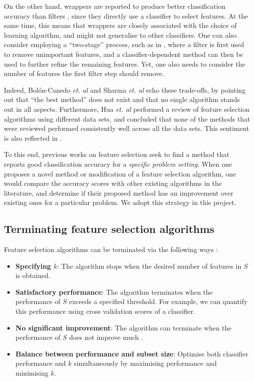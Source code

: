 \documentclass[12pt, twoside, a4paper]{report}
\begin{document}
On the other hand, wrappers are reported to produce better classification accuracy than filters \cite{RefWorks:163}, since they directly use a classifier to select features. At the same time, this means that wrappers are closely associated with the choice of learning algorithm, and might not generalise to other classifiers. One can also consider employing a ``two-stage'' process, such as in \cite{RefWorks:216}, where a filter is first used to remove unimportant features, and a classifier-dependent method can then be used to further refine the remaining features. Yet, one also needs to consider the number of features the first filter step should remove.

Indeed, Bolón-Canedo \textit{et. al} \cite{RefWorks:163} and Sharma \textit{et. al} \cite{RefWorks:215} echo these trade-offs, by pointing out that ``the best method'' does not exist and that no single algorithm stands out in all aspects. Furthermore, Hua \textit{et. al} \cite{RefWorks:216} performed a review of feature selection algorithms using different data sets, and concluded that none of the methods that were reviewed performed consistently well across all the data sets. This sentiment is also reflected in \cite{RefWorks:217}.

To this end, previous works on feature selection seek to find a method that reports good classification accuracy for a \textit{specific problem setting}. When one proposes a novel method or modification of a feature selection algorithm, one would compare the accuracy scores with other existing algorithms in the literature, and determine if their proposed method has an improvement over existing ones for a particular problem. We adopt this strategy in this project.

\subsection{Terminating feature selection algorithms} \label{bg:fs:terminating}

Feature selection algorithms can be terminated via the following ways \cite{RefWorks:210}:
\begin{itemize}
  \item \textbf{Specifying $k$}: The algorithm stops when the desired number of features in $S$ is obtained.
  \item \textbf{Satisfactory performance}: The algorithm terminates when the performance of $S$ exceeds a specified threshold. For example, we can quantify this performance using cross validation scores of a classifier.
  \item \textbf{No significant improvement}: The algorithm can terminate when the performance of $S$ does not improve much \cite{RefWorks:215}.
  \item \textbf{Balance between performance and subset size}: Optimise both classifier performance and $k$ simultaneously by maximising performance and minimising $k$.
\end{itemize}
\end{document}
